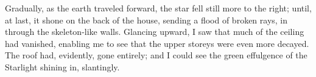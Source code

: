 Gradually, as the earth traveled forward, the star fell still more to the right; until, at last, it shone on the back of the house, sending a flood of broken rays, in through the skeleton-like walls. Glancing upward, I saw that much of the ceiling had vanished, enabling me to see that the upper storeys were even more decayed. The roof had, evidently, gone entirely; and I could see the green effulgence of the Starlight shining in, slantingly.

\clearpage
